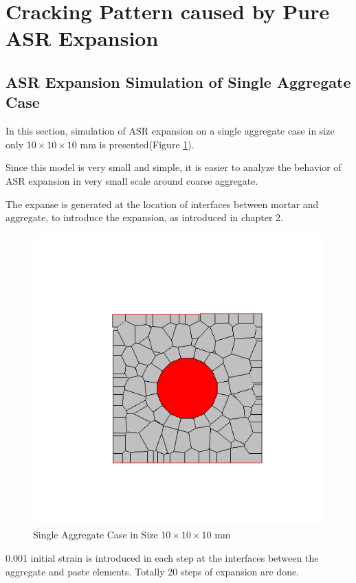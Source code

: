 \section{Cracking Pattern caused by Pure ASR Expansion}

\subsection{ASR Expansion Simulation of Single Aggregate Case}

In this section, simulation of ASR expansion on a single aggregate case in size only $10 \times 10 \times 10$ mm is presented(Figure \ref{smallasr}).

Since this model is very small and simple, it is easier to analyze the behavior of ASR expansion in very small scale around coarse aggregate.

The expanse is generated at the location of interfaces between mortar and aggregate, to introduce the expansion, as introduced in chapter 2.


\begin{figure}[h!]
\centering
\includegraphics[width=0.4\linewidth]{Files/Small_ASR/CR/DEP5-STEP(001).png}
\caption{Single Aggregate Case in Size $10 \times 10 \times 10$ mm}
\label{smallasr}
\end{figure}

0.001 initial strain is introduced in each step at the interfaces between the aggregate and paste elements. Totally 20 steps of expansion are done.


